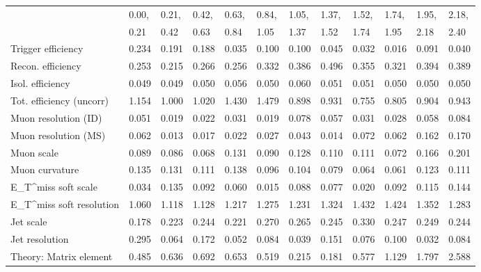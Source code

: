 \begin{tabular}{l|p{0.6cm}p{0.6cm}p{0.6cm}p{0.6cm}p{0.6cm}p{0.6cm}p{0.6cm}p{0.6cm}p{0.6cm}p{0.6cm}p{0.6cm}}
\hline
   & 0.00, & 0.21, & 0.42, & 0.63, & 0.84, & 1.05, & 1.37, & 1.52, & 1.74, & 1.95, & 2.18,  \\ 
   & 0.21 & 0.42 & 0.63 & 0.84 & 1.05 & 1.37 & 1.52 & 1.74 & 1.95 & 2.18 & 2.40  \\ 
\hline
Trigger efficiency                       & 0.234 & 0.191 & 0.188 & 0.035 & 0.100 & 0.100 & 0.045 & 0.032 & 0.016 & 0.091 & 0.040 \\
Recon. efficiency                        & 0.253 & 0.215 & 0.266 & 0.256 & 0.332 & 0.386 & 0.496 & 0.355 & 0.321 & 0.394 & 0.389 \\
Isol. efficiency                         & 0.049 & 0.049 & 0.050 & 0.056 & 0.050 & 0.060 & 0.051 & 0.051 & 0.050 & 0.050 & 0.050 \\
Tot. efficiency (uncorr)                 & 1.154 & 1.000 & 1.020 & 1.430 & 1.479 & 0.898 & 0.931 & 0.755 & 0.805 & 0.904 & 0.943 \\
Muon resolution (ID)                     & 0.051 & 0.019 & 0.022 & 0.031 & 0.019 & 0.078 & 0.057 & 0.031 & 0.028 & 0.058 & 0.084 \\
Muon resolution (MS)                     & 0.062 & 0.013 & 0.017 & 0.022 & 0.027 & 0.043 & 0.014 & 0.072 & 0.062 & 0.162 & 0.170 \\
Muon scale                               & 0.089 & 0.086 & 0.068 & 0.131 & 0.090 & 0.128 & 0.110 & 0.111 & 0.072 & 0.166 & 0.201 \\
Muon curvature                           & 0.135 & 0.131 & 0.111 & 0.138 & 0.096 & 0.104 & 0.079 & 0.064 & 0.061 & 0.123 & 0.111 \\
E_{T}^{miss} soft scale                  & 0.034 & 0.135 & 0.092 & 0.060 & 0.015 & 0.088 & 0.077 & 0.020 & 0.092 & 0.115 & 0.144 \\
E_{T}^{miss} soft resolution             & 1.060 & 1.118 & 1.128 & 1.217 & 1.275 & 1.231 & 1.324 & 1.432 & 1.424 & 1.352 & 1.283 \\
Jet scale                                & 0.178 & 0.223 & 0.244 & 0.221 & 0.270 & 0.265 & 0.245 & 0.330 & 0.247 & 0.249 & 0.244 \\
Jet resolution                           & 0.295 & 0.064 & 0.172 & 0.052 & 0.084 & 0.039 & 0.151 & 0.076 & 0.100 & 0.032 & 0.084 \\
Theory: Matrix element                   & 0.485 & 0.636 & 0.692 & 0.653 & 0.519 & 0.215 & 0.181 & 0.577 & 1.129 & 1.797 & 2.588 \\

\end{tabular}
